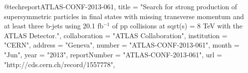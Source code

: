 @techreport{ATLAS-CONF-2013-061,
      title         = "{Search for strong production of supersymmetric particles
                       in final states with missing transverse momentum and at
                       least three b-jets using 20.1 fb$^{-1}$ of pp collisions at
                       sqrt(s) = 8 TeV with the ATLAS Detector.}",
      collaboration = "ATLAS Collaboration",
      institution   = "CERN",
      address       = "Geneva",
      number        = "ATLAS-CONF-2013-061",
      month         = "Jun",
      year          = "2013",
      reportNumber  = "ATLAS-CONF-2013-061",
      url           = "http://cds.cern.ch/record/1557778",
}

